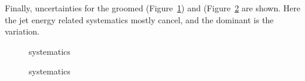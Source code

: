Finally, uncertainties for the groomed \zg (Figure~\ref{Figure:Systematics-JetZG}) and \Rg (Figure~\ref{Figure:Systematics-JetRG} are shown.  Here the jet energy related systematics mostly cancel, and the dominant is the \SVD variation.
%
\begin{figure}[htp!]
    \centering
    \caption{\zg systematics}
    \label{Figure:Systematics-JetZG}
\end{figure}
%
\begin{figure}[htp!]
    \centering
    \caption{\Rg systematics}
    \label{Figure:Systematics-JetRG}
\end{figure}






\clearpage

